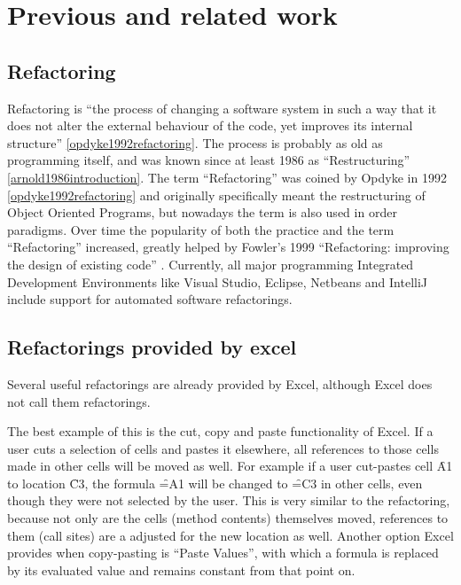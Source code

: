 
\chapter{Previous and related work}
\label{chapter:previouswork}

\section{Refactoring}


Refactoring is ``the process of changing a software system in such a way that it does not alter the external behaviour of the code, yet improves its internal structure'' \ref{opdyke1992refactoring}.
The process is probably as old as programming itself, and was known since at least 1986 as ``Restructuring'' \ref{arnold1986introduction}.
The term ``Refactoring'' was coined by Opdyke in 1992 \ref{opdyke1992refactoring} and originally specifically meant the restructuring of Object Oriented Programs, but nowadays the term is also used in order paradigms.
Over time the popularity of both the practice and the term ``Refactoring'' increased, greatly helped by Fowler's 1999 ``Refactoring: improving the design of existing code'' \cite{fowler1999refactoring}.
Currently, all major programming Integrated Development Environments like Visual Studio, Eclipse, Netbeans and IntelliJ include support for automated software refactorings.

\section{Refactorings provided by excel}

Several useful refactorings are already provided by Excel, although Excel does not call them refactorings.

The best example of this is the cut, copy and paste functionality of Excel.
If a user cuts a selection of cells and pastes it elsewhere, all references to those cells made in other cells will be moved as well.
For example if a user cut-pastes cell \f{A1} to location \f{C3}, the formula \f{=A1} will be changed to \f{=C3} in other cells, even though they were not selected by the user.
This is very similar to the  \cite{fowler1999refactoring} refactoring, because not only are the cells (method contents) themselves moved, references to them (call sites) are a adjusted for the new location as well.
Another option Excel provides when copy-pasting is ``Paste Values'', with which a formula is replaced by its evaluated value and remains constant from that point on.


